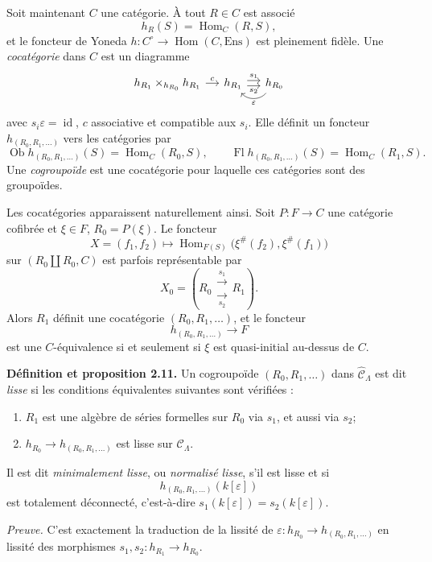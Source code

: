 \documentclass[11pt]{article}
\providecommand{\Hom}{\operatorname{Hom}}
\begin{document}
Soit maintenant \(C\) une cat\'egorie. \`A tout \(R\in C\) est associ\'e
\[
 h_R(S)=\Hom_C(R,S),
\]
et le foncteur de Yoneda \(h:C^\circ\to\Hom(C,\mathrm{Ens})\) est pleinement fid\`ele.
Une \emph{cocat\'egorie} dans \(C\) est un diagramme
\[
\begin{tikzcd}[column sep=small]
h_{R_1}\times_{h_{R_0}}h_{R_1} \arrow[r,"c"] &
h_{R_1}
\arrow[r,shift left=0.55ex,"s_1"]
\arrow[r,shift right=0.55ex,"s_2"'] &
h_{R_0}
\arrow[l,bend left=50,"\varepsilon"]
\end{tikzcd}
\]
avec \(s_i\varepsilon=\operatorname{id}\), \(c\) associative et compatible aux \(s_i\).
Elle d\'efinit un foncteur \(h_{(R_0,R_1,\ldots)}\) vers les cat\'egories par
\[
 \operatorname{Ob}h_{(R_0,R_1,\ldots)}(S)=\Hom_C(R_0,S),\qquad
 \operatorname{Fl}h_{(R_0,R_1,\ldots)}(S)=\Hom_C(R_1,S).
\]
Une \emph{cogroupo\"ide} est une cocat\'egorie pour laquelle ces cat\'egories sont des
groupo\"ides.

Les cocat\'egories apparaissent naturellement ainsi. Soit \(P:F\to C\) une cat\'egorie
cofibr\'ee et \(\xi\in F\), \(R_0=P(\xi)\). Le foncteur
\[
 X=(f_1,f_2)\longmapsto
 \Hom_{F(S)}\bigl(\xi^\#(f_2),\xi^\#(f_1)\bigr)
\]
sur \((R_0\amalg R_0,C)\) est parfois repr\'esentable par
\[
 X_0=(R_0 \mathrel{\substack{\xrightarrow{s_1}\\[-.6ex]\xrightarrow[s_2]{}}} R_1).
\]
Alors \(R_1\) d\'efinit une cocat\'egorie \((R_0,R_1,\ldots)\), et le foncteur
\[
 h_{(R_0,R_1,\ldots)}\longrightarrow F
\]
est une \(C\)-\'equivalence si et seulement si \(\xi\) est quasi-initial au-dessus de \(C\).

\textbf{D\'efinition et proposition 2.11.} Un cogroupo\"ide \((R_0,R_1,\ldots)\) dans
\(\widehat{\mathcal C}_\Lambda\) est dit \emph{lisse} si les conditions \'equivalentes suivantes
sont v\'erifi\'ees :
\begin{enumerate}[label=(\roman*)]
\item \(R_1\) est une alg\`ebre de s\'eries formelles sur \(R_0\) via \(s_1\), et aussi via \(s_2\);
\item \(h_{R_0}\to h_{(R_0,R_1,\ldots)}\) est lisse sur \(\mathcal C_\Lambda\).
\end{enumerate}
Il est dit \emph{minimalement lisse}, ou \emph{normalis\'e lisse}, s'il est lisse et si
\[
 h_{(R_0,R_1,\ldots)}(k[\varepsilon])
\]
est totalement d\'econnect\'e, c'est-\`a-dire \(s_1(k[\varepsilon])=s_2(k[\varepsilon])\).

\emph{Preuve.} C'est exactement la traduction de la lissit\'e de
\(\varepsilon:h_{R_0}\to h_{(R_0,R_1,\ldots)}\) en lissit\'e des morphismes
\(s_1,s_2:h_{R_1}\to h_{R_0}\).
\end{document}
